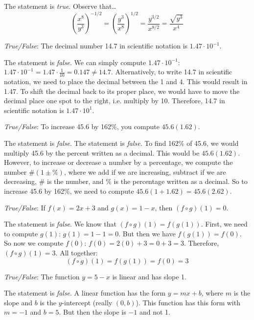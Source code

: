 \documentclass[11pt,letterpaper]{article}
\begin{document}
\sol The statement is \textit{true}. Observe that\dots
	\[
	\left( \dfrac{x^8}{y^3} \right)^{-1/2}= \left( \dfrac{y^3}{x^8} \right)^{1/2}= \dfrac{y^{3/2}}{x^{8/2}}= \dfrac{\sqrt{y^3}}{x^4}
	\]



\newpage



\quizsol \textit{True/False}: The decimal number 14.7 in scientific notation is $1.47 \cdot 10^{-1}$. \pspace

\sol The statement is \textit{false}. We can simply compute $1.47 \cdot 10^{-1}$: $1.47 \cdot 10^{-1}= 1.47 \cdot \frac{1}{10}= 0.147 \neq 14.7$. Alternatively, to write 14.7 in scientific notation, we need to place the decimal between the 1 and 4. This would result in 1.47. To shift the decimal back to its proper place, we would have to move the decimal place one spot to the right, i.e. multiply by 10. Therefore, 14.7 in scientific notation is $1.47 \cdot 10^1$. \pvspace{1.5cm}



\quizsol \textit{True/False}: To increase 45.6 by 162\%, you compute $45.6(1.62)$. \pspace

\sol The statement is \textit{false}. The statement is \textit{false}. To find 162\% of 45.6, we would multiply 45.6 by the percent written as a decimal. This would be $45.6(1.62)$. However, to increase or decrease a number by a percentage, we compute the number $\#(1 \pm \%)$, where we add if we are increasing, subtract if we are decreasing, $\#$ is the number, and \% is the percentage written as a decimal. So to increase 45.6 by 162\%, we need to compute $45.6(1 + 1.62)= 45.6(2.62)$. \pvspace{1.5cm}



\quizsol \textit{True/False}: If $f(x)= 2x + 3$ and $g(x)= 1 - x$, then $(f \circ g)(1)= 0$. \pspace

\sol The statement is \textit{false}. We know that $(f \circ g)(1)= f(g(1))$. First, we need to compute $g(1)$: $g(1)= 1 - 1= 0$. But then we have $f(g(1))= f(0)$. So now we compute $f(0)$: $f(0)= 2(0) + 3= 0 + 3= 3$. Therefore, $(f \circ g)(1)= 3$. All together:
	\[
	(f \circ g)(1)= f(g(1))= f(0)= 3
	\] \pvspace{1.5cm}



\quizsol \textit{True/False}: The function $y= 5 - x$ is linear and has slope 1. \pspace

\sol The statement is \textit{false}. A linear function has the form $y= mx + b$, where $m$ is the slope and $b$ is the $y$-intercept (really $(0, b)$). This function has this form with $m= -1$ and $b= 5$. But then the slope is $-1$ and not 1. \pvspace{1.3cm}
\end{document}

